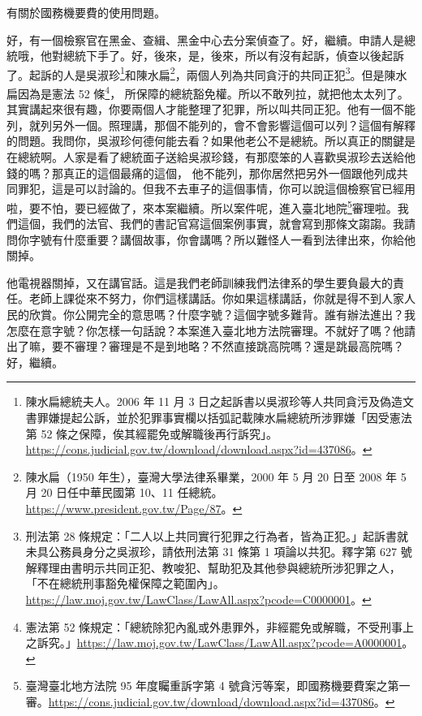 \hypertarget{c11:cue:24}{}有關於國務機要費的使用問題。\par{}好，有一個檢察官在黑金、查緝、黑金中心去分案偵查了。好，繼續。申請人是總統哦，他對總統下手了。好，後來，是，後來，所以有沒有起訴，偵查以後起訴了。起訴的人是吳淑珍\footnote{陳水扁總統夫人。2006 年 11 月 3 日之起訴書以吳淑珍等人共同貪污及偽造文書罪嫌提起公訴，並於犯罪事實欄以括弧記載陳水扁總統所涉罪嫌「因受憲法第 52 條之保障，俟其經罷免或解職後再行訴究」。\url{https://cons.judicial.gov.tw/download/download.aspx?id=437086}。}和陳水扁\footnote{陳水扁（1950 年生），臺灣大學法律系畢業，2000 年 5 月 20 日至 2008 年 5 月 20 日任中華民國第 10、11 任總統。\url{https://www.president.gov.tw/Page/87}。}，兩個人列為共同貪汙的共同正犯\footnote{刑法第 28 條規定：「二人以上共同實行犯罪之行為者，皆為正犯。」起訴書就未具公務員身分之吳淑珍，請依刑法第 31 條第 1 項論以共犯。釋字第 627 號解釋理由書明示共同正犯、教唆犯、幫助犯及其他參與總統所涉犯罪之人，「不在總統刑事豁免權保障之範圍內」。\url{https://law.moj.gov.tw/LawClass/LawAll.aspx?pcode=C0000001}。}。但是陳水扁因為是憲法 52 條\footnote{憲法第 52 條規定：「總統除犯內亂或外患罪外，非經罷免或解職，不受刑事上之訴究。」\url{https://law.moj.gov.tw/LawClass/LawAll.aspx?pcode=A0000001}。}，
\hypertarget{c11:cue:25}{}所保障的總統豁免權。所以不敢列拉，就把他太太列了。其實講起來很有趣，你要兩個人才能整理了犯罪，所以叫共同正犯。他有一個不能列，就列另外一個。照理講，那個不能列的，會不會影響這個可以列？這個有解釋的問題。我問你，吳淑珍何德何能去看？如果他老公不是總統。所以真正的關鍵是在總統啊。人家是看了總統面子送給吳淑珍錢，有那麼笨的人喜歡吳淑珍去送給他錢的嗎？那真正的這個最痛的這個，
\hypertarget{c11:cue:26}{}他不能列，那你居然把另外一個跟他列成共同罪犯，這是可以討論的。但我不去車子的這個事情，你可以說這個檢察官已經用啦，要不怕，要已經做了，來本案繼續。所以案件呢，進入臺北地院\footnote{臺灣臺北地方法院 95 年度矚重訴字第 4 號貪污等案，即國務機要費案之第一審。\url{https://cons.judicial.gov.tw/download/download.aspx?id=437086}。}審理啦。我們這個，我們的法官、我們的書記官寫這個案例事實，就會寫到那條文謅謅。我請問你字號有什麼重要？講個故事，你會講嗎？所以難怪人一看到法律出來，你給他關掉。

\hypertarget{c11:cue:27}{}他電視器關掉，又在講官話。這是我們老師訓練我們法律系的學生要負最大的責任。老師上課從來不努力，你們這樣講話。你如果這樣講話，你就是得不到人家人民的欣賞。你公開完全的意思嗎？什麼字號？這個字號多難背。誰有辦法進出？我怎麼在意字號？你怎樣一句話說？本案進入臺北地方法院審理。不就好了嗎？他請出了嘛，要不審理？審理是不是到地略？不然直接跳高院嗎？還是跳最高院嗎？好，繼續。

